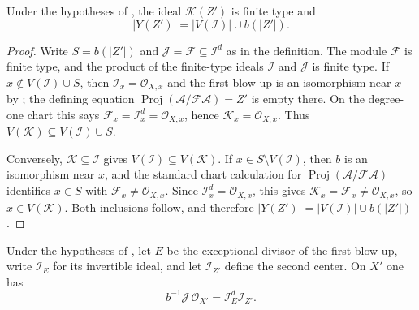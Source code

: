 \begin{lemma}
  \label{lemma:nagata-composition-center-ideal}

  Under the hypotheses of
  , the ideal $\mathcal K(Z')$ is
  finite type and
  \[
    |Y(Z')|=|V(\mathcal I)|\cup b(|Z'|).
  \]
\end{lemma}

\begin{proof}
  Write $S=b(|Z'|)$ and $\mathcal J=\mathcal F\subseteq\mathcal I^d$ as in
  the definition.  The module $\mathcal F$ is finite type, and the product of
  the finite-type ideals $\mathcal I$ and $\mathcal J$ is finite type.  If
  $x\notin V(\mathcal I)\cup S$, then $\mathcal I_x=\mathcal O_{X,x}$ and
  the first blow-up is an isomorphism near $x$ by
  ; the defining equation
  $\operatorname{Proj}(\mathcal A/\mathcal F\mathcal A)=Z'$ is empty there.
  On the degree-one chart this says $\mathcal F_x=\mathcal I_x^d=\mathcal O_{X,x}$,
  hence $\mathcal K_x=\mathcal O_{X,x}$.  Thus
  $V(\mathcal K)\subseteq V(\mathcal I)\cup S$.

  Conversely, $\mathcal K\subseteq\mathcal I$ gives
  $V(\mathcal I)\subseteq V(\mathcal K)$.  If $x\in S\setminus V(\mathcal I)$,
  then $b$ is an isomorphism near $x$, and the standard chart calculation for
  $\operatorname{Proj}(\mathcal A/\mathcal F\mathcal A)$ identifies
  $x\in S$ with $\mathcal F_x\ne\mathcal O_{X,x}$.  Since
  $\mathcal I_x^d=\mathcal O_{X,x}$, this gives
  $\mathcal K_x=\mathcal F_x\ne\mathcal O_{X,x}$, so
  $x\in V(\mathcal K)$.  Both inclusions follow, and therefore
  $|Y(Z')|=|V(\mathcal I)|\cup b(|Z'|)$.
\end{proof}


\begin{lemma}
  \label{lemma:nagata-composition-extended-ideal-equality}

  Under the hypotheses of
  , let $E$ be the exceptional
  divisor of the first blow-up, write $\mathcal I_E$ for its invertible ideal,
  and let $\mathcal I_{Z'}$ define the second center.  On $X'$ one has
  \[
    b^{-1}\mathcal J\,\mathcal O_{X'}
      =\mathcal I_E^d\mathcal I_{Z'}.
  \]
\end{lemma}

